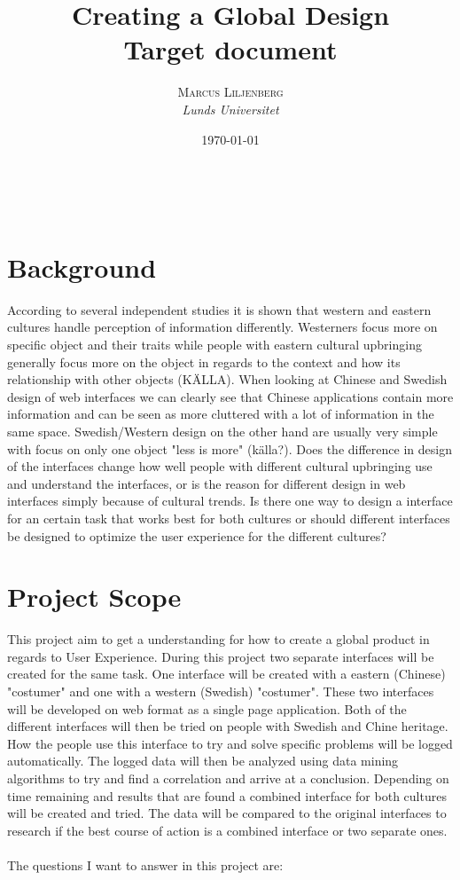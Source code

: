 \documentclass[a4paper, 11pt]{article} %
\title{\textbf{Creating a Global Design}\\ %
Target document} %
\author{\textsc{Marcus Liljenberg} %
\\{\textit{Lunds Universitet}}} %
\date{\today} %
\makeatletter
\renewcommand{\maketitle}{ %
\begin{flushright} %
{\LARGE\@title} %

\vspace{50pt} %

{\large\@author} %
\\\@date %

\vspace{40pt} %
\end{flushright}
}
\makeatother
\begin{document}
\maketitle %



\section*{Background}
According to several independent studies it is shown that western and eastern cultures handle perception of information differently. Westerners focus more on specific object and their traits while people with eastern cultural upbringing generally focus more on the object in regards to the context and how its relationship with other objects (KÄLLA). When looking at Chinese and Swedish design of web interfaces we can clearly see that Chinese applications contain more information and can be seen as more cluttered with a lot of information in the same space. Swedish/Western design on the other hand are usually very simple with focus on only one object "less is more" (källa?). Does the difference in design of the interfaces change how well people with different cultural upbringing use and understand the interfaces, or is the reason for different design in web interfaces simply because of cultural trends. Is there one way to design a interface for an certain task that works best for both cultures or should different interfaces be designed to optimize the user experience for the different cultures?

\section*{Project Scope}
This project aim to get a understanding for how to create a global product in regards to User Experience. During this project two separate interfaces will be created for the same task. One interface will be created with a eastern (Chinese) "costumer" and one with a western (Swedish) "costumer". These two interfaces will be developed on web format as a single page application. Both of the different interfaces will then be tried on people with Swedish and Chine heritage. How the people use this interface to try and solve specific problems will be logged automatically. The logged data will then be analyzed using data mining algorithms to try and find a correlation and arrive at a conclusion. Depending on time remaining and results that are found a combined interface for both cultures will be created and tried. The data will be compared to the original interfaces to research if the best course of action is a combined interface or two separate ones.
\\\\
The questions I want to answer in this project are:
\end{document}
